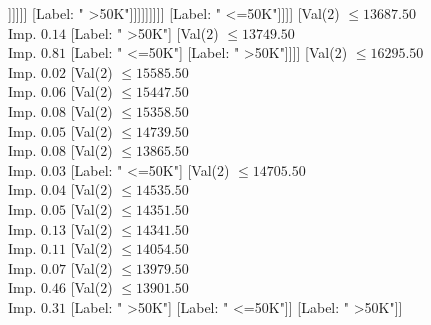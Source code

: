 \documentclass[margin=10pt]{standalone}
\begin{document}
\begin{forest}
																													[Val($2$) $ \leq 12957.50$ \\ Imp. $0.10$
																														[Label: " >50K"]
																														[Val($2$) $ \leq 13002.50$ \\ Imp. $0.05$
																															[Label: " <=50K"]
																															[Val($2$) $ \leq 13158.50$ \\ Imp. $0.42$
																																[Label: " >50K"]
																																[Val($2$) $ \leq 13168.50$ \\ Imp. $0.25$
																																	[Label: " <=50K"]
																																	[Label: " >50K"]]]]]]
																												[Label: " >50K"]]]]]]]]]
																				[Label: " <=50K"]]]]
																	[Val($2$) $ \leq 13687.50$ \\ Imp. $0.14$
																		[Label: " >50K"]
																		[Val($2$) $ \leq 13749.50$ \\ Imp. $0.81$
																			[Label: " <=50K"]
																			[Label: " >50K"]]]]
																[Val($2$) $ \leq 16295.50$ \\ Imp. $0.02$
																	[Val($2$) $ \leq 15585.50$ \\ Imp. $0.06$
																		[Val($2$) $ \leq 15447.50$ \\ Imp. $0.08$
																			[Val($2$) $ \leq 15358.50$ \\ Imp. $0.05$
																				[Val($2$) $ \leq 14739.50$ \\ Imp. $0.08$
																					[Val($2$) $ \leq 13865.50$ \\ Imp. $0.03$
																						[Label: " <=50K"]
																						[Val($2$) $ \leq 14705.50$ \\ Imp. $0.04$
																							[Val($2$) $ \leq 14535.50$ \\ Imp. $0.05$
																								[Val($2$) $ \leq 14351.50$ \\ Imp. $0.13$
																									[Val($2$) $ \leq 14341.50$ \\ Imp. $0.11$
																										[Val($2$) $ \leq 14054.50$ \\ Imp. $0.07$
																											[Val($2$) $ \leq 13979.50$ \\ Imp. $0.46$
																												[Val($2$) $ \leq 13901.50$ \\ Imp. $0.31$
																													[Label: " >50K"]
																													[Label: " <=50K"]]
																												[Label: " >50K"]]

\end{forest}
\end{document}
